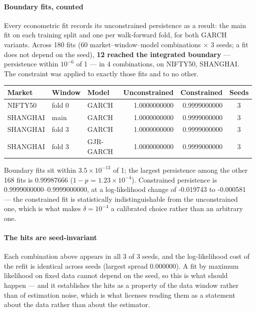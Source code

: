 \documentclass[11pt,a4paper]{article}
\makeatletter
\DeclareRobustCommand{\_}{\ifmmode\nfss@text{\textunderscore}\else\textunderscore\allowbreak\fi}
\makeatother
\begin{document}
\paragraph{Boundary fits, counted} Every econometric fit records its unconstrained persistence as a result: the main fit on each training split and one per walk-forward fold, for both GARCH variants. Across 180 fits (60 market--window--model combinations $\times$ 3 seeds; a fit does not depend on the seed), \textbf{12 reached the integrated boundary} --- persistence within $10^{-6}$ of 1 --- in 4 combinations, on NIFTY50, SHANGHAI. The constraint was applied to exactly those fits and to no other.

\smallskip
{\footnotesize
\begin{tabular}{@{}lllrrc@{}}
\toprule
Market & Window & Model & Unconstrained & Constrained & Seeds \\
\midrule
NIFTY50 & fold 0 & GARCH & 1.0000000000 & 0.9999000000 & 3 \\
SHANGHAI & main & GARCH & 1.0000000000 & 0.9999000000 & 3 \\
SHANGHAI & fold 3 & GARCH & 1.0000000000 & 0.9999000000 & 3 \\
SHANGHAI & fold 3 & GJR-GARCH & 1.0000000000 & 0.9999000000 & 3 \\
\bottomrule
\end{tabular}}

\smallskip
Boundary fits sit within $3.5\times10^{-13}$ of 1; the largest persistence among the other 168 fits is 0.99987666 ($1-p$ = $1.23\times10^{-4}$). Constrained persistence is 0.9999000000--0.9999000000, at a log-likelihood change of -0.019743 to -0.000581 --- the constrained fit is statistically indistinguishable from the unconstrained one, which is what makes $\delta=10^{-4}$ a calibrated choice rather than an arbitrary one.

\paragraph{The hits are seed-invariant} Each combination above appears in all 3 of 3 seeds, and the log-likelihood cost of the refit is identical across seeds (largest spread 0.000000). A fit by maximum likelihood on fixed data cannot depend on the seed, so this is what should happen --- and it establishes the hits as a property of the data window rather than of estimation noise, which is what licenses reading them as a statement about the data rather than about the estimator.
\end{document}
